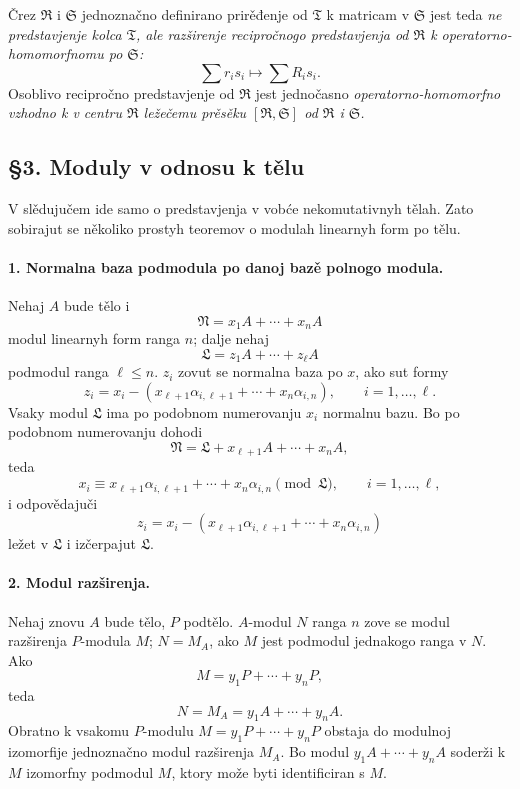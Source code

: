 \documentclass[11pt]{article}
\providecommand{\frL}{\mathfrak L}
\providecommand{\frN}{\mathfrak N}
\providecommand{\frR}{\mathfrak R}
\providecommand{\frS}{\mathfrak S}
\providecommand{\frT}{\mathfrak T}
\begin{document}
Črez \(\frR\) i \(\frS\) jednoznačno definirano prirěđenje od \(\frT\) k matricam v \(\frS\) jest teda \emph{ne predstavjenje kolca \(\frT\), ale razširenje recipročnogo predstavjenja od \(\frR\) k operatorno-homomorfnomu po \(\frS\):}
\[
        \sum r_i s_i\longmapsto \sum R_i s_i.
\]
Osoblivo recipročno predstavjenje od \(\frR\) jest jednočasno \emph{operatorno-homomorfno vzhodno k v centru \(\frR\) ležečemu prěsěku \([\frR,\frS]\) od \(\frR\) i \(\frS\).}

\subsection*{§3. Moduly v odnosu k tělu}

V slědujučem ide samo o predstavjenja v vobće nekomutativnyh tělah. Zato sobirajut se několiko prostyh teoremov o modulah linearnyh form po tělu.

\paragraph{1. Normalna baza podmodula po danoj bazě polnogo modula.}
Nehaj \(A\) bude tělo i
\[
        \frN=x_1A+\cdots+x_nA
\]
modul linearnyh form ranga \(n\); dalje nehaj
\[
        \frL=z_1A+\cdots+z_\ell A
\]
podmodul ranga \(\ell\le n\). \(z_i\) zovut se normalna baza po \(x\), ako sut formy
\[
        z_i=x_i-(x_{\ell+1}\alpha_{i,\ell+1}+\cdots+x_n\alpha_{i,n}),
        \qquad i=1,\ldots,\ell.
\]
Vsaky modul \(\frL\) ima po podobnom numerovanju \(x_i\) normalnu bazu. Bo po podobnom numerovanju dohodi
\[
        \frN=\frL+x_{\ell+1}A+\cdots+x_nA,
\]
teda
\[
        x_i\equiv x_{\ell+1}\alpha_{i,\ell+1}+\cdots+x_n\alpha_{i,n}
        \pmod{\frL},\qquad i=1,\ldots,\ell,
\]
i odpovědajuči
\[
        z_i=x_i-(x_{\ell+1}\alpha_{i,\ell+1}+\cdots+x_n\alpha_{i,n})
\]
ležet v \(\frL\) i izčerpajut \(\frL\).

\paragraph{2. Modul razširenja.}
Nehaj znovu \(A\) bude tělo, \(P\) podtělo. \(A\)-modul \(N\) ranga \(n\) zove se modul razširenja \(P\)-modula \(M\); \(N=M_A\), ako \(M\) jest podmodul jednakogo ranga v \(N\). Ako
\[
        M=y_1P+\cdots+y_nP,
\]
teda
\[
        N=M_A=y_1A+\cdots+y_nA.
\]
Obratno k vsakomu \(P\)-modulu \(M=y_1P+\cdots+y_nP\) obstaja do modulnoj izomorfije jednoznačno modul razširenja \(M_A\). Bo modul \(y_1A+\cdots+y_nA\) soderži k \(M\) izomorfny podmodul \(M\), ktory može byti identificiran s \(M\).
\end{document}
